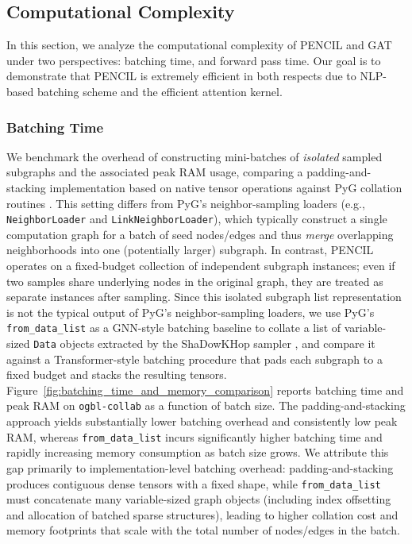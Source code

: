 \documentclass{article}
\theoremstyle{plain}
\theoremstyle{definition}
\theoremstyle{remark}
\begin{document}
\subsection{Computational Complexity} \label{app:computational-complexity}

In this section, we analyze the computational complexity of PENCIL and GAT under two perspectives: batching time, and forward pass time. Our goal is to demonstrate that PENCIL is extremely efficient in both respects due to NLP-based batching scheme and the efficient attention kernel.

\subsubsection{Batching Time}

We benchmark the overhead of constructing mini-batches of \emph{isolated} sampled subgraphs and the associated peak RAM usage, comparing a padding-and-stacking implementation based on native tensor operations against PyG collation routines \cite{fey2025pyg,fey2019pyg}. This setting differs from PyG's neighbor-sampling loaders (e.g., \texttt{NeighborLoader} and \texttt{LinkNeighborLoader}), which typically construct a single computation graph for a batch of seed nodes/edges and thus \emph{merge} overlapping neighborhoods into one (potentially larger) subgraph. In contrast, PENCIL operates on a fixed-budget collection of independent subgraph instances; even if two samples share underlying nodes in the original graph, they are treated as separate instances after sampling. Since this isolated subgraph list representation is not the typical output of PyG's neighbor-sampling loaders, we use PyG's \texttt{from\_data\_list} as a GNN-style batching baseline to collate a list of variable-sized \texttt{Data} objects extracted by the ShaDowKHop sampler \cite{zeng2021decoupling}, and compare it against a Transformer-style batching procedure that pads each subgraph to a fixed budget and stacks the resulting tensors. Figure~\ref{fig:batching_time_and_memory_comparison} reports batching time and peak RAM on \texttt{ogbl-collab} as a function of batch size. The padding-and-stacking approach yields substantially lower batching overhead and consistently low peak RAM, whereas \texttt{from\_data\_list} incurs significantly higher batching time and rapidly increasing memory consumption as batch size grows. We attribute this gap primarily to implementation-level batching overhead: padding-and-stacking produces contiguous dense tensors with a fixed shape, while \texttt{from\_data\_list} must concatenate many variable-sized graph objects (including index offsetting and allocation of batched sparse structures), leading to higher collation cost and memory footprints that scale with the total number of nodes/edges in the batch.
\end{document}

